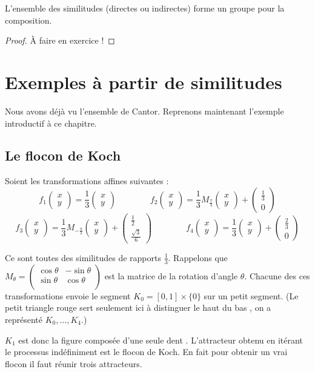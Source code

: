 \documentclass[11pt,class=report,crop=false]{standalone}
\newcommand{\myvec}[2]{\begin{pmatrix}#1 \\ #2\end{pmatrix}}
\newcommand{\commentfigure}[1]{#1} %
\begin{document}
\begin{proposition}
L'ensemble des similitudes (directes ou indirectes) forme un groupe pour la composition.
\end{proposition}

\begin{proof}
\`A faire en exercice !
\end{proof}


\section{Exemples à partir de similitudes}

Nous avons déjà vu l'ensemble de Cantor. 
Reprenons maintenant l'exemple introductif à ce chapitre.


\subsection{Le flocon de Koch}


Soient les transformations affines suivantes :
$$f_1 \myvec{x}{y} = \frac13 \myvec{x}{y} \qquad \qquad
f_2\myvec{x}{y} = \frac13 M_{\frac \pi 3} \myvec{x}{y}+ \myvec{\frac13}{0}$$
$$f_3\myvec{x}{y} = \frac13 M_{-\frac \pi 3}\myvec{x}{y}+ \myvec{\frac12}{\frac{\sqrt 3}{6}} \qquad \qquad
f_4\myvec{x}{y} = \frac13 \myvec{x}{y}+ \myvec{\frac23}{0}$$

Ce sont toutes des similitudes de rapports $\frac 13$.
Rappelons que $M_\theta = \begin{pmatrix}\cos \theta & -\sin \theta \\ 
\sin\theta & \cos \theta\\ \end{pmatrix}$
est la matrice de la rotation d'angle $\theta$.
Chacune des ces transformations envoie le segment $K_0 = [0,1]\times \{0\}$
sur un petit segment. (Le petit triangle rouge sert seulement ici à distinguer
le \og haut \fg{} du \og bas \fg{}, on a représenté $K_0,\ldots,K_4$.)

\commentfigure{
}

$K_1$ est donc la figure composée d'une seule \og dent \fg{}. L'attracteur obtenu en itérant le processus indéfiniment
est le flocon de Koch.
En fait pour obtenir un vrai flocon il faut réunir trois attracteurs.
\commentfigure{
}
\end{document}
